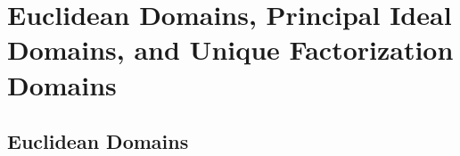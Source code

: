 \documentclass[../main]{subfiles}
\begin{document}
 
\section{Euclidean Domains, Principal Ideal Domains, and Unique Factorization Domains}


\subsection{Euclidean Domains}


\begin{dfn}
 
\end{dfn}

 
 
 
 
 
 
 
 
 
 
 
 
 
 
 
 
 
 
 
 
 
 
 
 
 
 
 
 
 
 
 
 
 
 
 
 
 
 
 
 
\end{document}
